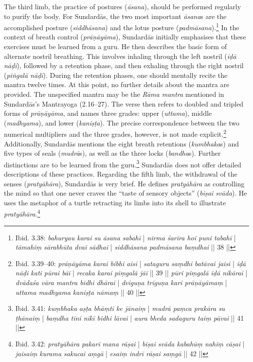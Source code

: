 The third limb, the practice of postures (\textit{āsana}), should be performed regularly to purify the body. For Sundardās, the two most important \textit{āsana}s are the accomplished posture (\textit{siddhāsana}) and the lotus posture (\textit{padmāsana}).\footnote{Ibid. 3.38: \textit{bahuryau karai su āsana sabahī} | \textit{nirma śarīra hoi puni tabahī} | \textit{tāmahiṃ sārabhūta dvai sādhai} | \textit{siddhāsana padmāsana baṃdhai} || 38 ||}
In the context of breath control (\textit{prāṇāyāma}), Sundardās initially emphasises that these exercises must be learned from a guru. He then describes the basic form of alternate nostril breathing. This involves inhaling through the left nostril (\textit{iḍā nāḍī}), followed by a retention phase, and then exhaling through the right nostril (\textit{piṅgalā nāḍī}). During the retention phases, one should mentally recite the mantra twelve times. At this point, no further details about the mantra are provided. The unspecified mantra may be the \textit{Rāma mantra} mentioned in Sundardās's Mantrayoga (2.16–27). The verse then refers to doubled and tripled forms of \textit{prāṇāyāma}, and names three grades: upper (\textit{uttama}), middle (\textit{madhyama}), and lower (\textit{kaniṣṭa}). The precise correspondence between the two numerical multipliers and the three grades, however, is not made explicit.\footnote{Ibid. 3.39–40: \textit{prāṇāyāma karai bibhi aisī} | \textit{sataguru saṃdhi batāvai jaisī} | \textit{iḍā nāḍi kati pūrai bāī} | \textit{recaka karai piṃgalā jāī} || 39 || \textit{pūri piṃgalā iḍā nikārai} | \textit{dvādaśa vāra mantra bidhi dhārai} | \textit{dviguṇa triguṇa kari prāṇāyāmaṃ} | \textit{uttama madhyama kaniṣṭa nāmaṃ} || 40 ||} Additionally, Sundardās mentions the eight breath retentions (\textit{kumbhaka}s) and five types of seals (\textit{mudrā}s), as well as the three locks (\textit{bandha}s). Further distinctions are to be learned from the guru.\footnote{Ibid. 3.41: \textit{kuṃbhaka aṣṭa bhāṃti ke jānaiṃ} | \textit{mudrā paṃca prakāra su ṭhānaiṃ} | \textit{baṃdha tīni nīkī bidhi lāvai} | \textit{aura bheda sadaguru taiṃ pāvai} || 41 ||} Sundardās does not offer detailed descriptions of these practices.
Regarding the fifth limb, the withdrawal of the senses (\textit{pratyāhāra}), Sundardās is very brief. He defines \textit{pratyāhāra} as controlling the mind so that one never craves the ``taste of sensory objects'' (\textit{biṣai svāda}). He uses the metaphor of a turtle retracting its limbs into its shell to illustrate \textit{pratyāhāra}.\footnote{Ibid. 3.42: \textit{pratyāhāra pakari mana rāṣai} | \textit{biṣai svāda kabahūṃ nahiṃ cāṣai} | \textit{jaisaiṃ kurama sakucai aṃgā} | \textit{esaiṃ indrī rāṣai saṃgā} || 42 ||}

